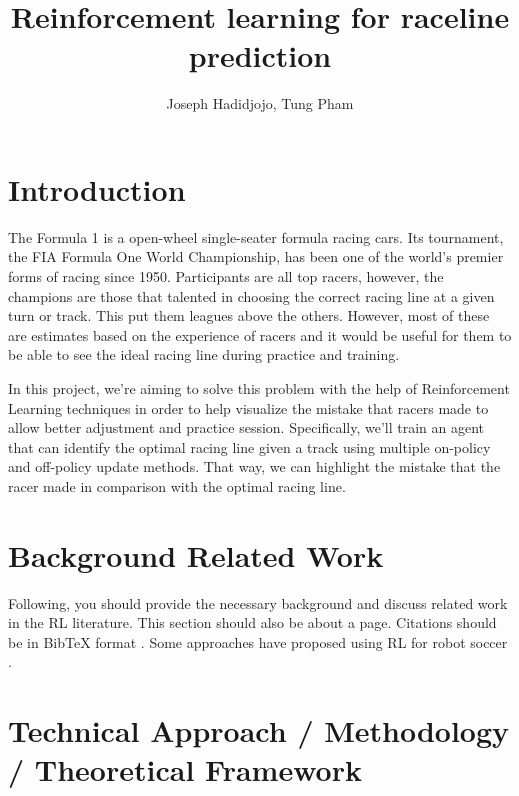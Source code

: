 \documentclass{article}
\title{Reinforcement learning for raceline prediction}
\author{Joseph Hadidjojo, Tung Pham}
\date{\vspace{-1em}}
\begin{document}
\maketitle


\section{Introduction}

The Formula 1 is a open-wheel single-seater formula racing cars. Its tournament,
the FIA Formula One World Championship, has been one of the world's premier forms of racing since 1950.
Participants are all top racers, however, the champions are those that talented
in choosing the correct racing line at a given turn or track. This put them
leagues above the others. However, most of these are estimates based on the
experience of racers and it would be useful for them to be able to see the ideal
racing line during practice and training.

In this project, we're aiming to solve this problem with the help of
Reinforcement Learning techniques in order to help visualize the mistake that
racers made to allow better adjustment and practice session. Specifically, we'll
train an agent that can identify the optimal racing line given a track using
multiple on-policy and off-policy update methods. That way, we can highlight the
mistake that the racer made in comparison with the optimal racing line.

\section{Background Related Work}

Following, you should provide the necessary background and discuss related work in the RL literature. This section should also be about a page. Citations should be in BibTeX format \citep{thrun2005probabilistic}. Some approaches have proposed using RL for robot soccer \cite{riedmiller2009reinforcement}.

\section{Technical Approach / Methodology / Theoretical Framework}
\end{document}
